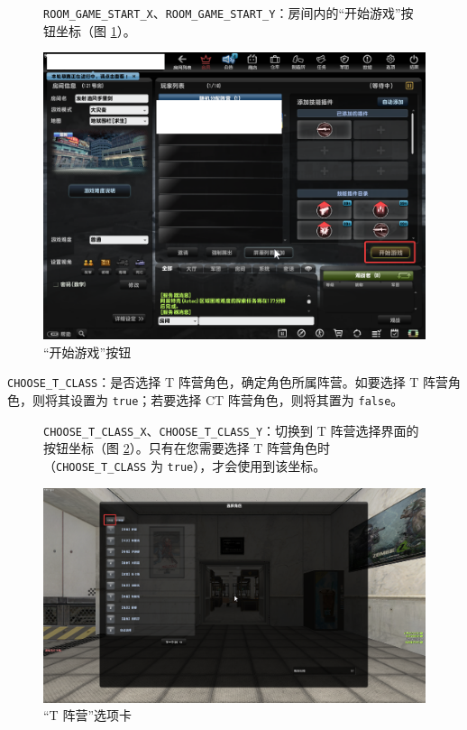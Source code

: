 \begin{figure}[H]
    \Centering
    \parbox[l]{\textwidth}{\lstinline{ROOM_GAME_START_X}、\lstinline{ROOM_GAME_START_Y}：房间内的“开始游戏”按钮坐标（图 \ref{ch2fig-start-game}）。}
    \includegraphics[width=\textwidth]{docs/assets/start_game.png}
    \caption{“开始游戏”按钮}
    \label{ch2fig-start-game}
\end{figure}
\clearpage

\lstinline{CHOOSE_T_CLASS}：是否选择 T 阵营角色，确定角色所属阵营。如要选择 T 阵营角色，则将其设置为 \lstinline{true}；若要选择 CT 阵营角色，则将其置为 \lstinline{false}。

\begin{figure}[H]
    \Centering
    \parbox[l]{\textwidth}{\lstinline{CHOOSE_T_CLASS_X}、\lstinline{CHOOSE_T_CLASS_Y}：切换到 T 阵营选择界面的按钮坐标（图 \ref{ch2fig-choose-t-class}）。只有在您需要选择 T 阵营角色时（\lstinline{CHOOSE_T_CLASS} 为 \lstinline{true}），才会使用到该坐标。}
    \includegraphics[width=\textwidth]{docs/assets/choose_T_class.png}
    \caption{“T 阵营”选项卡}
    \label{ch2fig-choose-t-class}
\end{figure}
\clearpage

